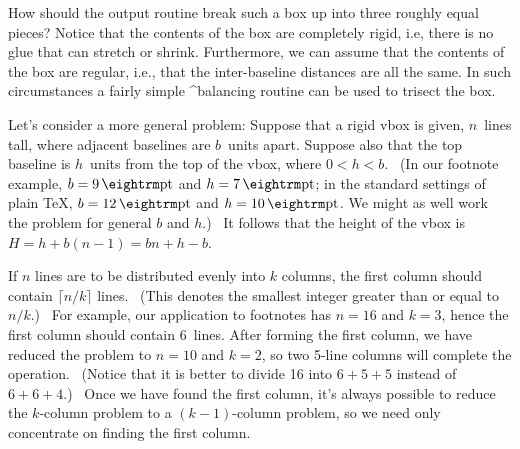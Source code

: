 {How should the output routine break such a box up into three roughly
equal pieces? Notice that the contents of the box are completely rigid,
i.e, there is no glue that can stretch or shrink. Furthermore, we can
assume that the contents of the box are regular, i.e., that the
inter-baseline distances are all the same. In such circumstances
a fairly simple ^{balancing} routine can be used to trisect the box.

Let's consider a more general problem: Suppose that a rigid vbox is given,
$n$~lines tall, where adjacent baselines are $b$~units apart. Suppose
also that the top baseline is $h$~units from the top of the
vbox, where $0<h<b$. \ (In our footnote example, $b=9\pt$ and $h=7\pt$;
in the standard settings of plain \TeX, $b=12\pt$ and $h=10\pt$. We might
as well work the problem for general $b$ and $h$.) \ It follows that
the height of the vbox is $H=h+b(n-1)=bn+h-b$.

If $n$ lines are to be distributed evenly into $k$ columns, the first
column should contain $\lceil n/k\rceil$ lines. \ (This denotes the
smallest integer greater than or equal to $n/k$.) \ For example,
our application to footnotes has $n=16$ and $k=3$, hence the first
column should contain 6~lines. After forming the first column,
we have reduced the problem to $n=10$ and $k=2$, so two 5-line
columns will complete the operation. \ (Notice that it is better
to divide 16 into $6+5+5$ instead of $6+6+4$.) \ Once we have
found the first column, it's always possible to reduce the $k$-column
problem to a $(k-1)$-column problem, so we need only concentrate
on finding the first column.

}
